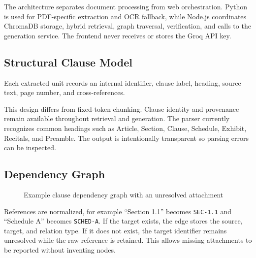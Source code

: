 \documentclass[12pt,a4paper,oneside]{report}
\begin{document}
The architecture separates document processing from web orchestration. Python is used for PDF-specific extraction and OCR fallback, while Node.js coordinates ChromaDB storage, hybrid retrieval, graph traversal, verification, and calls to the generation service. The frontend never receives or stores the Groq API key.

\subsection{Structural Clause Model}
Each extracted unit records an internal identifier, clause label, heading, source text, page number, and cross-references.

This design differs from fixed-token chunking. Clause identity and provenance remain available throughout retrieval and generation. The parser currently recognizes common headings such as Article, Section, Clause, Schedule, Exhibit, Recitals, and Preamble. The output is intentionally transparent so parsing errors can be inspected.

\subsection{Dependency Graph}
\begin{figure}[H]
\centering
{}
\caption{Example clause dependency graph with an unresolved attachment}
\label{fig:graph}
\end{figure}

References are normalized, for example ``Section 1.1'' becomes \texttt{SEC-1.1} and ``Schedule A'' becomes \texttt{SCHED-A}. If the target exists, the edge stores the source, target, and relation type. If it does not exist, the target identifier remains unresolved while the raw reference is retained. This allows missing attachments to be reported without inventing nodes.
\end{document}
